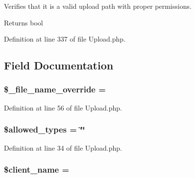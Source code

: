 Verifies that it is a valid upload path with proper permissions.

\begin{DoxyReturn}{Returns}
bool 
\end{DoxyReturn}


Definition at line 337 of file Upload.\+php.



\subsection{Field Documentation}
\subsubsection[{\texorpdfstring{\$\+\_\+file\+\_\+name\+\_\+override}{$_file_name_override}}]{\setlength{\rightskip}{0pt plus 5cm}\$\+\_\+file\+\_\+name\+\_\+override = \textquotesingle{}\textquotesingle{}\hspace{0.3cm}{\ttfamily [protected]}}\hypertarget{class_c_i___upload_a9f09c7cb693d391de63f9c8e91f159e1}{}\label{class_c_i___upload_a9f09c7cb693d391de63f9c8e91f159e1}


Definition at line 56 of file Upload.\+php.

\subsubsection[{\texorpdfstring{\$allowed\+\_\+types}{$allowed_types}}]{\setlength{\rightskip}{0pt plus 5cm}\$allowed\+\_\+types = \char`\"{}\char`\"{}}\hypertarget{class_c_i___upload_a2e0df9e15179e2db66d161206842d6c0}{}\label{class_c_i___upload_a2e0df9e15179e2db66d161206842d6c0}


Definition at line 34 of file Upload.\+php.

\subsubsection[{\texorpdfstring{\$client\+\_\+name}{$client_name}}]{\setlength{\rightskip}{0pt plus 5cm}\$client\+\_\+name = \textquotesingle{}\textquotesingle{}}\hypertarget{class_c_i___upload_a3b81ba4d3535269e20e0b4a2ddab2edc}{}\label{class_c_i___upload_a3b81ba4d3535269e20e0b4a2ddab2edc}


